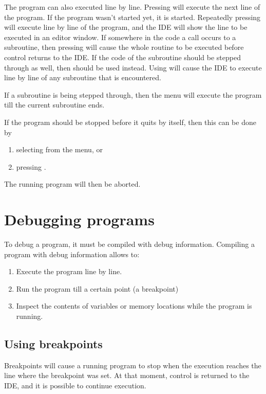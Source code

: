 The program can also executed line by line. Pressing  will 
execute the next line of the program. If the program wasn't started
yet, it is started. Repeatedly pressing  will execute line 
by line of the program, and the IDE will show the line to be executed 
in an editor window. If somewhere in the code a call occurs to a subroutine,
then pressing  will cause the whole routine to be executed before
control returns to the IDE. If the code of the subroutine should be stepped
through as well, then  should be used instead. Using  will
cause the IDE to execute line by line of any subroutine that is encountered.

If a subroutine is being stepped through, then the  menu
will execute the program till the current subroutine ends. 

If the program should be stopped before it quits by itself, then this can be
done by
\begin{enumerate}
\item selecting  from the menu, or
\item pressing .
\end{enumerate}
The running program will then be aborted.

\section{Debugging programs}
\label{se:debugging}
To debug a program, it must be compiled with debug information. Compiling a
program with debug information allows to:
\begin{enumerate}
\item Execute the program line by line.
\item Run the program till a certain point (a breakpoint)
\item Inspect the contents of variables or memory locations while the
program is running.
\end{enumerate}
%
%
\subsection{Using breakpoints}
Breakpoints will cause a running program to stop when the execution
reaches the line where the breakpoint was set. At that moment, control
is returned to the IDE, and it is possible to continue execution.

